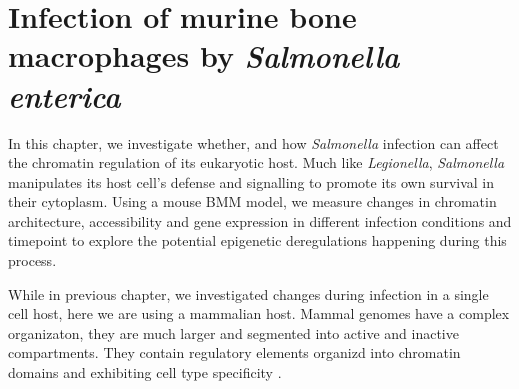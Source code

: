 \textsc{}%

\chapter{Infection of murine bone macrophages by \textit{Salmonella enterica}} %

\label{ch:02-03} %


In this chapter, we investigate whether, and how \textit{Salmonella} infection can affect the chromatin regulation of its eukaryotic host. Much like \textit{Legionella}, \textit{Salmonella} manipulates its host cell's defense and signalling to promote its own survival in their cytoplasm. Using a mouse \acrfull{BMM} model, we measure changes in chromatin architecture, accessibility and gene expression in different infection conditions and timepoint to explore the potential epigenetic deregulations happening during this process.

While in previous chapter, we investigated changes during infection in a single cell host, here we are using a mammalian host. Mammal genomes have a complex organizaton, they are much larger and segmented into active and inactive compartments. They contain regulatory elements organizd into chromatin domains and exhibiting cell type specificity \cite{schmittCompendiumChromatinContact2016}.

